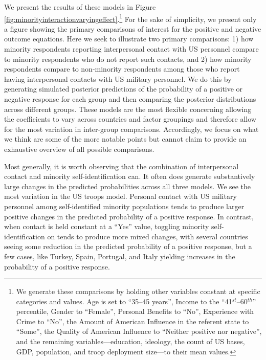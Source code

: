 We present the results of these models in Figure \ref{fig:minorityinteractionvaryingeffect}.\footnote{We generate these comparisons by holding other variables constant at specific categories and values. Age is set to ``35--45 years'', Income to the ``41$^{st}$--60$^{th}$'' percentile, Gender to ``Female'', Personal Benefits to ``No'', Experience with Crime to ``No'', the Amount of American Influence in the referent state to ``Some'', the Quality of American Influence to ``Neither positive nor negative'', and the remaining variables---education, ideology, the count of US bases, GDP, population, and troop deployment size---to their mean values.} For the sake of simplicity, we present only a figure showing the primary comparisons of interest for the positive and negative outcome equations. Here we seek to illustrate two primary comparisons: 1) how minority respondents reporting interpersonal contact with US personnel compare to minority respondents who do not report such contacts, and 2) how minority respondents compare to non-minority respondents among those who report having interpersonal contacts with US military personnel. We do this by generating simulated posterior predictions of the probability of a positive or negative response for each group and then comparing the posterior distributions across different groups. These models are the most flexible concerning allowing the coefficients to vary across countries and factor groupings and therefore allow for the most variation in inter-group comparisons. Accordingly, we focus on what we think are some of the more notable points but cannot claim to provide an exhaustive overview of all possible comparisons.

Most generally, it is worth observing that the combination of interpersonal contact and minority self-identification can. It often does generate substantively large changes in the predicted probabilities across all three models. We see the most variation in the US troops model. Personal contact with US military personnel among self-identified minority populations tends to produce larger positive changes in the predicted probability of a positive response. In contrast, when contact is held constant at a ``Yes'' value, toggling minority self-identification on tends to produce more mixed changes, with several countries seeing some reduction in the predicted probability of a positive response, but a few cases, like Turkey, Spain, Portugal, and Italy yielding increases in the probability of a positive response. 

